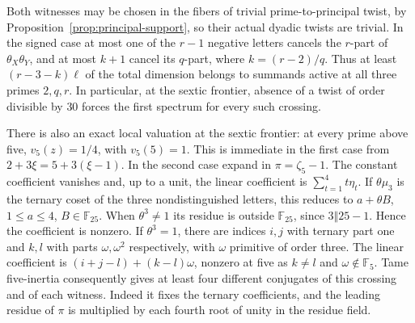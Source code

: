 \documentclass[11pt,a4paper]{article}
\numberwithin{equation}{section}
\theoremstyle{remark}
\begin{document}
Both witnesses may be chosen in the fibers of trivial prime-to-principal
twist, by Proposition~\ref{prop:principal-support}, so their actual dyadic twists are trivial.
In the signed case at most one of the $r-1$ negative letters cancels
the $r$-part of $\theta_X\theta_Y$, and at most $k+1$ cancel its
$q$-part, where $k=(r-2)/q$. Thus at least
$(r-3-k)\ell$ of the total dimension belongs to summands active at all
three primes $2,q,r$. In particular, at the sextic frontier, absence
of a twist of order divisible by $30$ forces the first spectrum for
every such crossing.

There is also an exact local valuation at the sextic frontier:
at every prime above five, $v_5(z)=1/4$, with $v_5(5)=1$. This is
immediate in the first case from $2+3\xi=5+3(\xi-1)$.
In the second case expand in $\pi=\zeta_5-1$.
The constant coefficient vanishes and, up to a unit, the linear
coefficient is $\sum_{t=1}^4 t\eta_t$. If $\theta\mu_3$ is the
ternary coset of the three nondistinguished letters, this reduces
to $a+\theta B$, $1\le a\le4$, $B\in\mathbb F_{25}$.
When $\theta^3\ne1$ its residue is outside $\mathbb F_{25}$, since
$3\Vert25-1$. Hence the coefficient is nonzero. If $\theta^3=1$,
there are indices $i,j$ with ternary part one and $k,l$ with parts
$\omega,\omega^2$ respectively, with $\omega$ primitive of order three.
The linear coefficient is $(i+j-l)+(k-l)\omega$, nonzero at five
as $k\ne l$ and $\omega\notin\mathbb F_5$. Tame five-inertia
consequently gives at least four different conjugates of this crossing
and of each witness. Indeed it fixes the ternary coefficients, and
the leading residue of $\pi$ is multiplied by each fourth root of
unity in the residue field.
\end{document}
